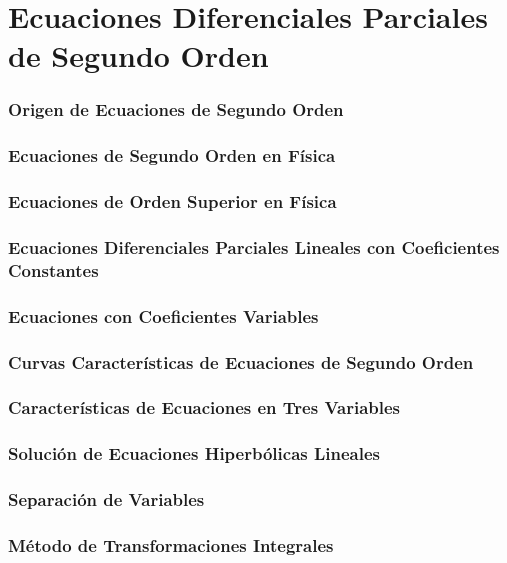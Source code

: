 \newpage
\part{Ecuaciones Diferenciales Parciales de Segundo Orden}


\section{Origen de Ecuaciones de Segundo Orden}

\section{Ecuaciones de Segundo Orden en Física}

\section{Ecuaciones de Orden Superior en Física}

\section{Ecuaciones Diferenciales Parciales Lineales con Coeficientes Constantes}

\section{Ecuaciones con Coeficientes Variables}

\section{Curvas Características de Ecuaciones de Segundo Orden}

\section{Características de Ecuaciones en Tres Variables}

\section{Solución de Ecuaciones Hiperbólicas Lineales}

\section{Separación de Variables}

\section{Método de Transformaciones Integrales}


